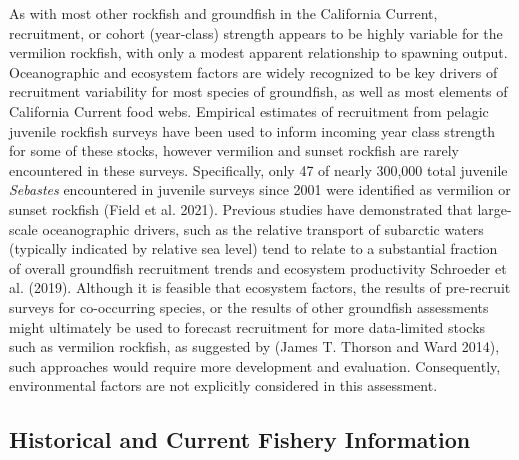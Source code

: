 \documentclass[11pt,
  english,
  a4paper,
]{article}
\begin{document}

As with most other rockfish and groundfish in the California Current, recruitment, or cohort (year-class) strength appears to be highly variable for the vermilion rockfish, with only a modest apparent relationship to spawning output. Oceanographic and ecosystem factors are widely recognized to be key drivers of recruitment variability for most species of groundfish, as well as most elements of California Current food webs. Empirical estimates of recruitment from pelagic juvenile rockfish surveys have been used to inform incoming year class strength for some of these stocks, however vermilion and sunset rockfish are rarely encountered in these surveys. Specifically, only 47 of nearly 300,000 total juvenile \emph{Sebastes} encountered in juvenile surveys since 2001 were identified as vermilion or sunset rockfish {(Field et al. 2021)\leavevmode\tagmcend\tagstructend}. Previous studies have demonstrated that large-scale oceanographic drivers, such as the relative transport of subarctic waters (typically indicated by relative sea level) tend to relate to a substantial fraction of overall groundfish recruitment trends and ecosystem productivity {Schroeder et al. (2019)\leavevmode\tagmcend\tagstructend}. Although it is feasible that ecosystem factors, the results of pre-recruit surveys for co-occurring species, or the results of other groundfish assessments might ultimately be used to forecast recruitment for more data-limited stocks such as vermilion rockfish, as suggested by {(James T. Thorson and Ward 2014)\leavevmode\tagmcend\tagstructend}, such approaches would require more development and evaluation. Consequently, environmental factors are not explicitly considered in this assessment.

\leavevmode\tagmcend\tagstructend\par


\hypertarget{historical-and-current-fishery-information}{%
\subsection{Historical and Current Fishery Information}\label{historical-and-current-fishery-information}}

\leavevmode\tagmcend\tagstructend
\end{document}

